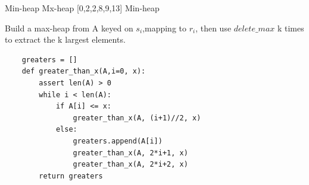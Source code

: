 \documentclass[12pt,twoside]{article}
\begin{document}
\begin{problems}
\newpage
\problem  %

\begin{problemparts}
\problempart %
Min-heap
\problempart %
Mx-heap
\problempart %
{[0,2,2,8,9,13]}
\problempart %
Min-heap
\end{problemparts}

\newpage
\problem  %

\begin{problemparts}
\problempart %
Build a max-heap from A keyed on $s_i$,mapping to $r_i$,
then use $delete\_max$ k times to extract the k largest elements.
\problempart %
\begin{verbatim}
    greaters = []
    def greater_than_x(A,i=0, x):
        assert len(A) > 0
        while i < len(A):
            if A[i] <= x:
                greater_than_x(A, (i+1)//2, x)
            else:
                greaters.append(A[i])
                greater_than_x(A, 2*i+1, x)
                greater_than_x(A, 2*i+2, x)
        return greaters

\end{verbatim}

\end{problemparts}


\end{problems}
\end{document}
